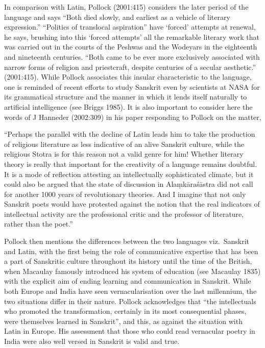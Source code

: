 In comparison with Latin, Pollock (2001:415) considers the later period of the language and says “Both died slowly, and earliest as a vehicle of literary expression.” “Politics of translocal aspiration” have ‘forced’ attempts at renewal, he says, brushing into this ‘forced attempts’ all the remarkable literary work that was carried out in the courts of the Peshwas and the Wodeyars in the eighteenth and nineteenth centuries. “Both came to be ever more exclusively associated with narrow forms of religion and priestcraft, despite centuries of a secular aesthetic.” (2001:415). While Pollock associates this insular characteristic to the language, one is reminded of recent efforts to study Sanskrit even by scientists at NASA for its grammatical structure and the manner in which it lends itself naturally to artificial intelligence (see Briggs 1985). It is also important to consider here the words of J Hanneder (2002:309) in his paper responding to Pollock on the matter, 

\begin{myquote}
“Perhaps the parallel with the decline of Latin leads him to take the production of religious literature as less indicative of an alive Sanskrit culture, while the religious Stotra is for this reason not a valid genre for him! Whether literary theory is really that important for the creativity of a language remains doubtful. It is a mode of reflection attesting an intellectually sophisticated climate, but it could also be argued that the state of discussion in Alaṃkāraśāstra did not call for another 1000 years of revolutionary theories. And I imagine that not only Sanskrit poets would have protested against the notion that the real indicators of intellectual activity are the professional critic and the professor of literature, rather than the poet.” 
\end{myquote}

Pollock then mentions the differences between the two languages viz.\ Sanskrit and Latin, with the first being the role of communicative expertise that has been a part of Sanskritic culture throughout its history until the time of the British, when Macaulay famously introduced his system of education (see Macaulay 1835) with the explicit aim of ending learning and communication in Sanskrit. While both Europe and India have seen vernacularisation over the last millennium, the two situations differ in their nature. Pollock acknowledges that “the intellectuals who promoted the transformation, certainly in its most consequential phases, were themselves learned in Sanskrit”, and this, as against the situation with Latin in Europe.  His assessment that those who could read vernacular poetry in India were also well versed in Sanskrit is valid and true. 


